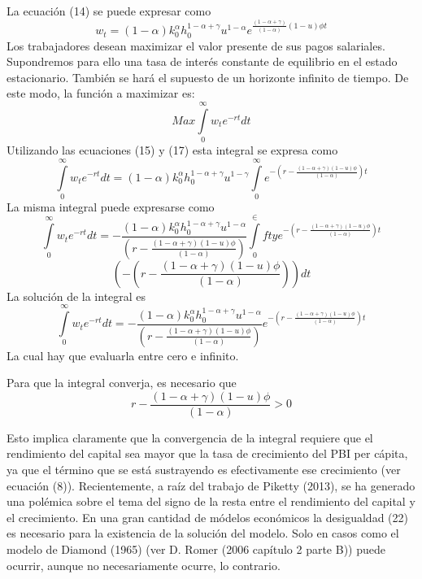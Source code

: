 \documentclass[12pt,notitlepage]{report}
\newcommand{\icis}{{\textstyle\int\limits_0^\infty}w_te^{-rt}dt}
\newcommand{\suma}{(1-\alpha + \gamma)}
\newcommand{\fphi}{\frac{\suma (1-u)\phi}{(1-\alpha)}}
\begin{document}
	La ecuación (14) se puede expresar como
	\begin{equation}\label{ecu17}
		w_t=(1-\alpha)k_0^\alpha h_0^{1-\alpha +\gamma}u^{1-\alpha}e^{\frac{(1-\alpha + \gamma)}{(1-\alpha)}(1-u)\phi t}
	\end{equation} 
	Los trabajadores desean maximizar el valor presente de sus pagos salariales.\\
	Supondremos para ello una tasa de interés constante de equilibrio en el estado estacionario. También se hará el supuesto de un horizonte infinito de tiempo.
	De este modo, la función a maximizar es:
	\begin{equation}\label{ecu18}
		Max\icis
	\end{equation}
	Utilizando las ecuaciones (15) y (17) esta integral se expresa como 
	\begin{equation}\label{ecu19}
		\icis =(1-\alpha)k_0^\alpha h_0^{1-\alpha + \gamma} u^{1-\gamma}\int\limits_0^\infty e^{-(r-\fphi)t}
	\end{equation}
	La misma integral puede expresarse como
	\begin{equation}\label{ecu20}
		\icis=-\frac{(1-\alpha)k_0^\alpha h_0^{1-\alpha + \gamma}u^{1-\alpha}}{(r-\fphi)}\int\limits_0^\in
		fty e^{-(r-\fphi)t}
	\end{equation}
	$$(-(r-\fphi))dt$$
	La solución de la integral es
	\begin{equation}\label{ecu21}
		\icis =-\frac{(1-\alpha)k_0^\alpha h_0^{1-\alpha + \gamma} u^{1-\alpha}}{(r-\fphi)} e^{-(r-\fphi)t}
	\end{equation}
	La cual hay que evaluarla entre cero e infinito.
	
	Para que la integral converja, es necesario que
	\begin{equation}\label{ecu22}
		r-\fphi >0
	\end{equation}
	
	Esto implica claramente que la convergencia de la integral requiere que el rendimiento del capital sea mayor que la tasa de crecimiento del PBI per cápita, ya que el término que se está sustrayendo es efectivamente ese crecimiento (ver ecuación (8)). Recientemente, a raíz del trabajo de Piketty (2013), se ha generado una polémica sobre el tema del signo de la resta entre el rendimiento del capital y el crecimiento. En una gran cantidad de módelos económicos la desigualdad (22) es necesario para la existencia de la solución del modelo. Solo en casos como el modelo de Diamond (1965) (ver D. Romer (2006 capítulo 2 parte B)) puede ocurrir, aunque no necesariamente ocurre, lo contrario.
	
\end{document}
